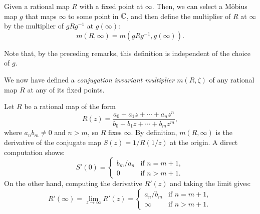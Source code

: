\begin{definition}
    Given a rational map $R$ with a fixed point at $\infty$. Then, we can select
    a Möbius map $g$ that maps $\infty$ to some point in $\mathbb{C}$, and then define
    the multiplier of $R$ at $\infty$ by the multiplier of $g R g^{-1}$ at
    $g(\infty)$:
    \begin{equation*}
        m(R, \infty) = m(g R g^{-1}, g(\infty)).
    \end{equation*}
\end{definition}

Note that, by the preceding remarks, this definition is independent of the
choice of $g$.

\begin{remark}
    We now have defined a \emph{conjugation invariant multiplier $m(R, \zeta)$}
    of any rational map $R$ at any of its fixed points.
\end{remark}

\begin{example}
    Let $R$ be a rational map of the form
    \begin{equation*}
        R(z) = \frac{a_0 + a_1 z + \cdots + a_n z^n}{b_0 + b_1 z + \cdots + b_m z^m},
    \end{equation*}
    where $a_n b_m \neq 0$ and $n > m$, so $R$ fixes $\infty$. By definition,
    $m(R, \infty)$ is the derivative of the conjugate map $S(z) = 1/R(1/z)$ at
    the origin. A direct computation shows:
    \begin{equation*}
        S'(0) =
        \begin{cases}
            b_m/a_n & \text{if } n = m + 1, \\
            0 & \text{if } n > m + 1.
        \end{cases}
    \end{equation*}
    On the other hand, computing the derivative $R'(z)$ and taking the limit
    gives:
    \begin{equation*}
        R'(\infty) = \lim_{z \to \infty} R'(z) =
        \begin{cases}
            a_n/b_m & \text{if } n = m + 1, \\
            \infty & \text{if } n > m + 1.
        \end{cases}
    \end{equation*}
\end{example}

